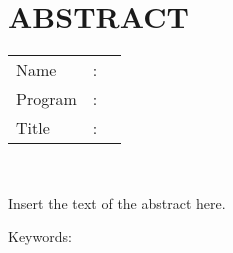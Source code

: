 %
%
%

\chapter*{ABSTRACT}

\vspace*{0.2cm}

\noindent \begin{tabular}{l l p{11.0cm}}
	Name&: & \penulis \\
	Program&: & \programstudi \\
	Title&: & \judulInggris \\
\end{tabular} \\ 

\vspace*{0.5cm}

\noindent
Insert the text of the abstract here.


\vspace*{0.2cm}

\noindent Keywords: \\ 
\noindent {}

\newpage